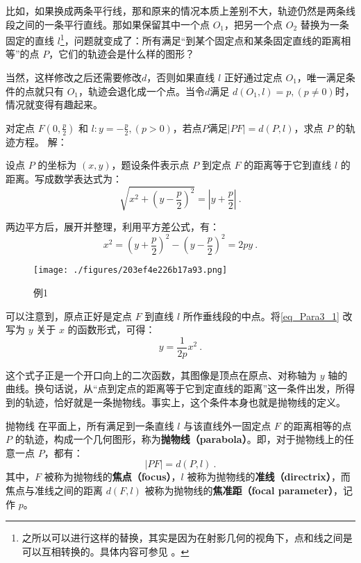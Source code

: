 比如，如果换成两条平行线，那和原来的情况本质上差别不大，轨迹仍然是两条线段之间的一条平行直线。那如果保留其中一个点 $O_1$，把另一个点 $O_2$ 替换为一条固定的直线 $l$\footnote{之所以可以进行这样的替换，其实是因为在射影几何的视角下，点和线之间是可以互相转换的。具体内容可参见 。}，问题就变成了：所有满足“到某个固定点和某条固定直线的距离相等”的点 $P$，它们的轨迹会是什么样的图形？

当然，这样修改之后还需要修改$d$，否则如果直线 $l$ 正好通过定点 $O_1$，唯一满足条件的点就只有 $O_1$，轨迹会退化成一个点。当令$d$满足 $d(O_1,l)=p,(p\neq0)$时，情况就变得有趣起来。

\begin{example}{对定点 $F\left(0, \displaystyle\frac{p}{2}\right)$ 和 $l:y=-\displaystyle\frac{p}{2},\left(p>0\right)$，若点$P$满足$|PF|=d(P,l)$，求点 $P$ 的轨迹方程。}\label{ex_Para3_1}
解：

设点 $P$ 的坐标为 $(x, y)$，题设条件表示点 $P$ 到定点 $F$ 的距离等于它到直线 $l$ 的距离。写成数学表达式为：
\begin{equation}
\sqrt{x^2 + \left(y - \frac{p}{2}\right)^2} = |y + \frac{p}{2}|~.
\end{equation}

两边平方后，展开并整理，利用平方差公式，有：
\begin{equation}\label{eq_Para3_1}
x^2 = \left(y + \frac{p}{2}\right)^2 - \left(y - \frac{p}{2}\right)^2 = 2py~.
\end{equation}
\begin{figure}[ht]
\centering
\texttt{[image: ./figures/203ef4e226b17a93.png]}
\caption{例1} \label{fig_Para3_5}
\end{figure}
\end{example}


可以注意到，原点正好是定点 $F$ 到直线 $l$ 所作垂线段的中点。将\autoref{eq_Para3_1} 改写为 $y$ 关于 $x$ 的函数形式，可得：
\begin{equation}\label{eq_Para3_2}
y = \frac{1}{2p}x^2~.
\end{equation}

这个式子正是一个开口向上的二次函数，其图像是顶点在原点、对称轴为 $y$ 轴的曲线。换句话说，从“点到定点的距离等于它到定直线的距离”这一条件出发，所得到的轨迹，恰好就是一条抛物线。事实上，这个条件本身也就是抛物线的定义。

\begin{definition}{抛物线}
在平面上，所有满足到一条直线 $l$ 与该直线外一固定点 $F$ 的距离相等的点 $P$ 的轨迹，构成一个几何图形，称为\textbf{抛物线（parabola）}。即，对于抛物线上的任意一点 $P$，都有：
\begin{equation}
|PF| = d(P, l)~.
\end{equation}
其中，$F$ 被称为抛物线的\textbf{焦点（focus）}，$l$ 被称为抛物线的\textbf{准线（directrix）}，而焦点与准线之间的距离 $d(F, l)$ 被称为抛物线的\textbf{焦准距（focal parameter）}，记作 $p$。
\end{definition}

